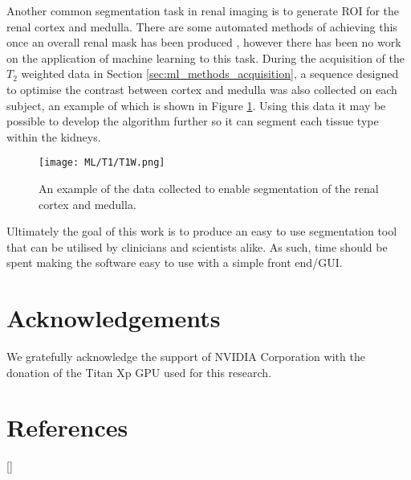 Another common segmentation task in renal imaging is to generate \ac{ROI} for the renal cortex and medulla. There are some automated methods of achieving this once an overall renal mask has been produced \cite{cox_multiparametric_2017}, however there has been no work on the application of machine learning to this task. During the acquisition of the $T_2$ weighted data in Section \ref{sec:ml_methods_acquisition}, a sequence designed to optimise the contrast between cortex and medulla was also collected on each subject, an example of which is shown in Figure \ref{fig:ml_t1}. Using this data it may be possible to develop the algorithm further so it can segment each tissue type within the kidneys.

\begin{figure}[H]
	\centering
	\texttt{[image: ML/T1/T1W.png]}
	\caption{An example of the data collected to enable segmentation of the renal cortex and medulla.}
	\label{fig:ml_t1}
\end{figure}

Ultimately the goal of this work is to produce an easy to use segmentation tool that can be utilised by clinicians and scientists alike. As such, time should be spent making the software easy to use with a simple front end/\ac{GUI}.

\section{Acknowledgements}

We gratefully acknowledge the support of NVIDIA Corporation with the donation of the Titan Xp GPU used for this research.

\newpage
\section{References}
[\refname]{}
\printbibliography